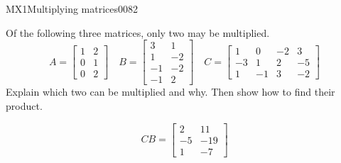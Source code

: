 \begin{exercise}{MX1}{Multiplying matrices}{0082} 
\begin{exerciseStatement} 

Of the following three matrices, only two may be multiplied. \[
          A=\left[\begin{array}{cc}
1 & 2 \\
0 & 1 \\
0 & 2
\end{array}\right] \hspace{1em} B=\left[\begin{array}{cc}
3 & 1 \\
1 & -2 \\
-1 & -2 \\
-1 & 2
\end{array}\right] \hspace{1em} C=\left[\begin{array}{cccc}
1 & 0 & -2 & 3 \\
-3 & 1 & 2 & -5 \\
1 & -1 & 3 & -2
\end{array}\right]
      \] Explain which two can be multiplied and why. Then show how to find their product.

 \end{exerciseStatement}
 \begin{exerciseAnswer} \[CB=\left[\begin{array}{cc}
2 & 11 \\
-5 & -19 \\
1 & -7
\end{array}\right]\] \end{exerciseAnswer}
 \end{exercise}


\newpage




